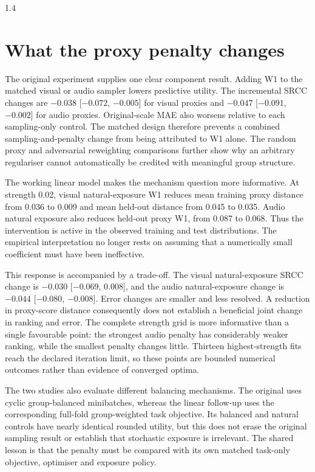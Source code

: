 \begin{spacing}{1.4}
\section{What the proxy penalty changes}

The original experiment supplies one clear component result. Adding W1 to the matched
visual or audio sampler lowers predictive utility. The incremental SRCC changes are
$-0.038$ [$-0.072$, $-0.005$] for visual proxies and $-0.047$
[$-0.091$, $-0.002$] for audio proxies. Original-scale MAE also worsens relative to
each sampling-only control. The matched design therefore prevents a combined
sampling-and-penalty change from being attributed to W1 alone. The random proxy and
adversarial reweighting comparisons further show why an arbitrary regulariser cannot
automatically be credited with meaningful group structure.

The working linear model makes the mechanism question more informative. At strength
0.02, visual natural-exposure W1 reduces mean training proxy distance from 0.036 to
0.009 and mean held-out distance from 0.045 to 0.035. Audio natural exposure also reduces
held-out proxy W1, from 0.087 to 0.068. Thus the intervention is active in the observed
training and test distributions. The empirical interpretation no longer rests on
assuming that a numerically small coefficient must have been ineffective.

This response is accompanied by a trade-off. The visual natural-exposure SRCC change is
$-0.030$ [$-0.069$, 0.008], and the audio natural-exposure change is $-0.044$
[$-0.080$, $-0.008$]. Error changes are smaller and less resolved. A reduction in
proxy-score distance consequently does not establish a beneficial joint change in
ranking and error. The complete strength grid is more informative than a single favourable
point: the strongest audio penalty has considerably weaker ranking, while the smallest
penalty changes little. Thirteen highest-strength fits reach the declared iteration limit,
so these points are bounded numerical outcomes rather than evidence of converged optima.

The two studies also evaluate different balancing mechanisms. The original uses cyclic
group-balanced minibatches, whereas the linear follow-up uses the corresponding full-fold
group-weighted task objective. Its balanced and natural controls have nearly identical
rounded utility, but this does not erase the original sampling result or establish that
stochastic exposure is irrelevant. The shared lesson is that the penalty must be compared
with its own matched task-only objective, optimiser and exposure policy.


\end{spacing}
